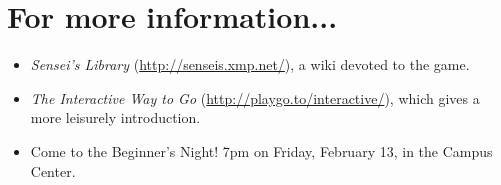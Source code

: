 \documentclass{article}
\begin{document}
\section*{For more information...}
\begin{itemize}

\item \emph{Sensei's Library} (\url{http://senseis.xmp.net/}), a wiki
  devoted to the game.

\item \emph{The Interactive Way to Go}
  (\url{http://playgo.to/interactive/}), which gives a more leisurely
  introduction.

\item Come to the Beginner's Night!  7pm on Friday, February 13, in
  the Campus Center.
\end{itemize}
\end{document}
